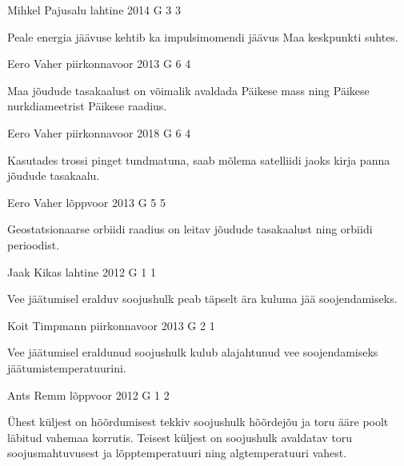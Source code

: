\documentclass[11pt, twoside]{article}
\begin{document}
{%
{Mihkel Pajusalu} %
{lahtine} %
{2014} %
{G 3} %
{3} %
{

\ifHint
Peale energia jäävuse kehtib ka impulsimomendi jäävus Maa keskpunkti suhtes.
\fi
}

{Eero Vaher} %
{piirkonnavoor} %
{2013} %
{G 6} %
{4} %
{

\ifHint
Maa jõudude tasakaalust on võimalik avaldada Päikese mass ning Päikese nurkdiameetrist Päikese raadius.
\fi
}

{Eero Vaher} %
{piirkonnavoor} %
{2018} %
{G 6} %
{4} %
{

\ifHint
Kasutades trossi pinget tundmatuna, saab mõlema satelliidi jaoks kirja panna jõudude tasakaalu.
\fi
}

{Eero Vaher} %
{lõppvoor} %
{2013} %
{G 5} %
{5} %
{

\ifHint
Geostatsionaarse orbiidi raadius on leitav jõudude tasakaalust ning orbiidi perioodist.
\fi
}

{Jaak Kikas} %
{lahtine} %
{2012} %
{G 1} %
{1} %
{

\ifHint
Vee jäätumisel eralduv soojushulk peab täpselt ära kuluma jää soojendamiseks.
\fi
}

{Koit Timpmann} %
{piirkonnavoor} %
{2013} %
{G 2} %
{1} %
{

\ifHint
Vee jäätumisel eraldunud soojushulk kulub alajahtunud vee soojendamiseks jäätumistemperatuurini.
\fi
}

{Ants Remm} %
{lõppvoor} %
{2012} %
{G 1} %
{2} %
{

\ifHint
Ühest küljest on hõõrdumisest tekkiv soojushulk hõõrdejõu ja toru ääre poolt läbitud vahemaa korrutis. Teisest küljest on soojushulk avaldatav toru soojusmahtuvusest ja lõpptemperatuuri ning algtemperatuuri vahest.
\fi
}

}
\end{document}
